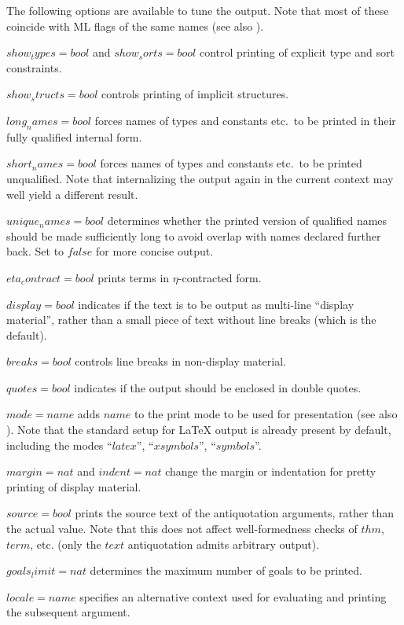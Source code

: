 The following options are available to tune the output.  Note that most of
these coincide with ML flags of the same names (see also \cite{isabelle-ref}).
\begin{descr}
\item[$show_types = bool$ and $show_sorts = bool$] control printing of
  explicit type and sort constraints.
\item[$show_structs = bool$] controls printing of implicit structures.
\item[$long_names = bool$] forces names of types and constants etc.\ to be
  printed in their fully qualified internal form.
\item[$short_names = bool$] forces names of types and constants etc.\ to be
  printed unqualified.  Note that internalizing the output again in the
  current context may well yield a different result.
\item[$unique_names = bool$] determines whether the printed version of
  qualified names should be made sufficiently long to avoid overlap with names
  declared further back.  Set to $false$ for more concise output.
\item[$eta_contract = bool$] prints terms in $\eta$-contracted form.
\item[$display = bool$] indicates if the text is to be output as multi-line
  ``display material'', rather than a small piece of text without line breaks
  (which is the default).
\item[$breaks = bool$] controls line breaks in non-display material.
\item[$quotes = bool$] indicates if the output should be enclosed in double
  quotes.
\item[$mode = name$] adds $name$ to the print mode to be used for presentation
  (see also \cite{isabelle-ref}).  Note that the standard setup for {\LaTeX}
  output is already present by default, including the modes ``$latex$'',
  ``$xsymbols$'', ``$symbols$''.
\item[$margin = nat$ and $indent = nat$] change the margin or indentation for
  pretty printing of display material.
\item[$source = bool$] prints the source text of the antiquotation arguments,
  rather than the actual value.  Note that this does not affect
  well-formedness checks of $thm$, $term$, etc. (only the $text$ antiquotation
  admits arbitrary output).
\item[$goals_limit = nat$] determines the maximum number of goals to be
  printed.
\item[$locale = name$] specifies an alternative context used for evaluating
  and printing the subsequent argument.
\end{descr}

